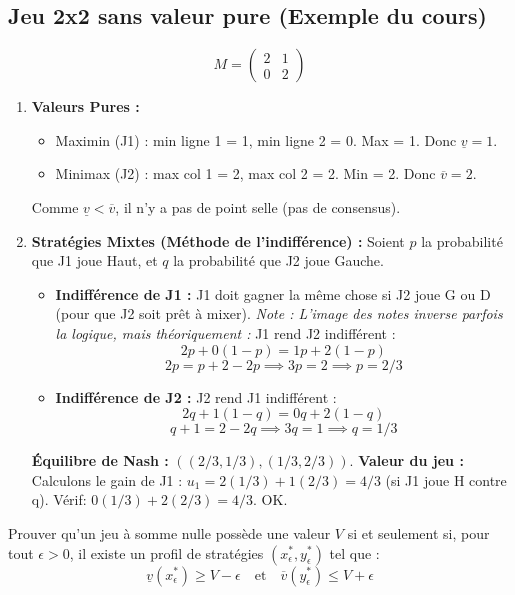 \subsection{Jeu 2x2 sans valeur pure (Exemple du cours)}
$$M = \begin{pmatrix} 2 & 1 \\ 0 & 2 \end{pmatrix}$$
\begin{enumerate}
    \item \textbf{Valeurs Pures :}
    \begin{itemize}
        \item Maximin (J1) : min ligne 1 = 1, min ligne 2 = 0. Max = 1. Donc $\underline{v} = 1$.
        \item Minimax (J2) : max col 1 = 2, max col 2 = 2. Min = 2. Donc $\overline{v} = 2$.
    \end{itemize}
    Comme $\underline{v} < \overline{v}$, il n'y a pas de point selle (pas de consensus).

    \item \textbf{Stratégies Mixtes (Méthode de l'indifférence) :}
    Soient $p$ la probabilité que J1 joue Haut, et $q$ la probabilité que J2 joue Gauche.
    \begin{itemize}
        \item \textbf{Indifférence de J1 :} J1 doit gagner la même chose si J2 joue G ou D (pour que J2 soit prêt à mixer).
         \textit{Note : L'image des notes inverse parfois la logique, mais théoriquement :}
         J1 rend J2 indifférent :
         $$2p + 0(1-p) = 1p + 2(1-p)$$
         $$2p = p + 2 - 2p \implies 3p = 2 \implies p = 2/3$$
        
        \item \textbf{Indifférence de J2 :} J2 rend J1 indifférent :
        $$2q + 1(1-q) = 0q + 2(1-q)$$
        $$q + 1 = 2 - 2q \implies 3q = 1 \implies q = 1/3$$
    \end{itemize}
    \textbf{Équilibre de Nash :} $((2/3, 1/3), (1/3, 2/3))$.
    \textbf{Valeur du jeu :} Calculons le gain de J1 :
    $u_1 = 2(1/3) + 1(2/3) = 4/3$ (si J1 joue H contre q).
    Vérif: $0(1/3) + 2(2/3) = 4/3$. OK.
\end{enumerate}

\begin{exercice}
Prouver qu'un jeu à somme nulle possède une valeur $V$ si et seulement si, pour tout $\epsilon > 0$, il existe un profil de stratégies $(x^*_\epsilon, y^*_\epsilon)$ tel que :
$$ \underline{v}(x^*_\epsilon) \ge V - \epsilon \quad \text{et} \quad \overline{v}(y^*_\epsilon) \le V + \epsilon $$
\end{exercice}

